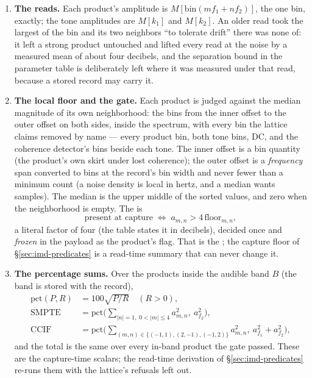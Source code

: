 \documentclass[11pt,a4paper]{article}
\begin{document}
{\begin{enumerate}
\item \textbf{The reads.} Each product's amplitude is $M[\mathrm{bin}(m f_1
+ n f_2)]$, the one bin, exactly; the tone amplitudes are $M[k_1]$ and
$M[k_2]$. An older read took the largest of the bin and its two
neighbors ``to tolerate drift'' there was none of: it left a strong
product untouched and lifted every read at the noise by a measured mean
of about four decibels, and the separation bound in the parameter table
is deliberately left where it was measured under that read, because a
stored record may carry it.

\item \textbf{The local floor and the gate.} Each product is judged
against the median magnitude of its own neighborhood: the bins from the
inner offset to the outer offset on both sides, inside the spectrum, with
every bin the lattice claims removed by name --- every product bin, both
tone bins, DC, and the coherence detector's bins beside each tone. The
inner offset is a bin quantity (the product's own skirt under lost
coherence); the outer offset is a \emph{frequency} span converted to bins
at the record's bin width and never fewer than a minimum count (a noise
density is local in hertz, and a median wants samples). The median is the
upper middle of the sorted values, and zero when the neighborhood is
empty. The  is
\begin{equation}
  \text{present at capture} \;\Leftrightarrow\; a_{m,n} > 4\,\mathrm{floor}_{m,n},
  \label{eq:gate}
\end{equation}
a literal factor of four (the table states it in decibels), decided once
and \emph{frozen} in the payload as the product's flag. That is the
; the capture floor of \S\ref{sec:imd-predicates} is a
read-time summary that can never change it.

\item \textbf{The percentage sums.} Over the products inside the
audible band $B$ (the band is stored with the record),
\begin{equation}
  \begin{aligned}
  \mathrm{pct}(P, R) &= 100\sqrt{P/R}\quad (R > 0),\\
  \text{SMPTE} &= \mathrm{pct}\!\Big(\!\sum_{|n| = 1,\; 0 < |m| \le 4} a_{m,n}^2,\ a_{f_2}^2\Big),\\
  \text{CCIF} &= \mathrm{pct}\!\Big(\!\sum_{(m,n) \in \{(-1,1),(2,-1),(-1,2)\}} a_{m,n}^2,\ a_{f_1}^2 + a_{f_2}^2\Big),
  \end{aligned}
  \label{eq:pct}
\end{equation}
and the total is the same over every in-band product the gate passed.
These are the capture-time scalars; the read-time derivation of
\S\ref{sec:imd-predicates} re-runs them with the lattice's refusals left
out.


\end{enumerate}}
\end{document}
